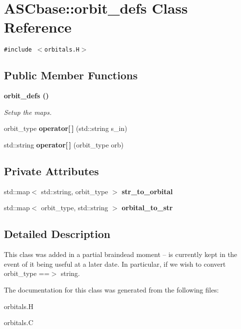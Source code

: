 \section{ASCbase::orbit\_\-defs Class Reference}
\label{classASCbase_1_1orbit__defs}
{\tt \#include $<$orbitals.H$>$}

\subsection*{Public Member Functions}
\begin{CompactItemize}
\item 
\bf{orbit\_\-defs} ()\label{classASCbase_1_1orbit__defs_f178133e808b549a98b9354d0d97f046}

\begin{CompactList}\small\item\em Setup the maps. \item\end{CompactList}\item 
orbit\_\-type \textbf{operator[$\,$]} (std::string s\_\-in)\label{classASCbase_1_1orbit__defs_37a563c355bd0525a0f71e50e40face0}

\item 
std::string \textbf{operator[$\,$]} (orbit\_\-type orb)\label{classASCbase_1_1orbit__defs_4d11bbc4895cfd6c4a17f8f08c45b58a}

\end{CompactItemize}
\subsection*{Private Attributes}
\begin{CompactItemize}
\item 
std::map$<$ std::string, orbit\_\-type $>$ \textbf{str\_\-to\_\-orbital}\label{classASCbase_1_1orbit__defs_3eb7b5ab7d8ddd75f6ad4c5dc465ae4a}

\item 
std::map$<$ orbit\_\-type, std::string $>$ \textbf{orbital\_\-to\_\-str}\label{classASCbase_1_1orbit__defs_d78ded4fad9f010bafef5c8501998267}

\end{CompactItemize}


\subsection{Detailed Description}
This class was added in a partial braindead moment -- is currently kept in the event of it being useful at a later date. In particular, if we wish to convert orbit\_\-type ==$>$ string. 



The documentation for this class was generated from the following files:\begin{CompactItemize}
\item 
orbitals.H\item 
orbitals.C\end{CompactItemize}
